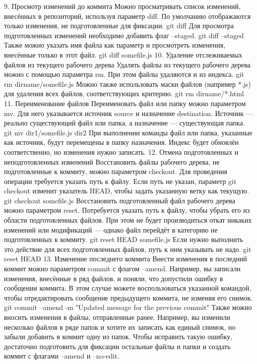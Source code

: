 {{{{{{{{{{{{{{{{{{{{9. Просмотр изменений до коммита
Можно просматривать список изменений, внесённых в репозиторий, используя параметр diff. По умолчанию отображаются только изменения, не подготовленные для фиксации.
git diff
Для просмотра подготовленных изменений необходимо добавить флаг --staged.
git diff --staged
Также можно указать имя файла как параметр и просмотреть изменения, внесённые только в этот файл.
git diff somefile.js
10. Удаление отслеживаемых файлов из текущего рабочего дерева
Удалять файлы из текущего рабочего дерева можно с помощью параметра rm. При этом файлы удаляются и из индекса.
git rm dirname/somefile.js
Можно также использовать маски файлов (например *.js) для удаления всех файлов, соответствующих критерию.
git rm dirname/*.html
11. Переименование файлов
Переименовать файл или папку можно параметром mv. Для него указывается источник source и назначение destination. Источник — реально существующий файл или папка, а назначение — существующая папка.
git mv dir1/somefile.js dir2
При выполнении команды файл или папка, указанные как источник, будут перемещены в папку назначения. Индекс будет обновлён соответственно, но изменения нужно записать.
12. Отмена подготовленных и неподготовленных изменений
Восстановить файлы рабочего дерева, не подготовленные к коммиту, можно параметром checkout. Для проведения операции требуется указать путь к файлу. Если путь не указан, параметр git checkout изменит указатель HEAD, чтобы задать указанную ветку как текущую.
git checkout somefile.js
Восстановить подготовленный файл рабочего дерева можно параметром reset. Потребуется указать путь к файлу, чтобы убрать его из области подготовленных файлов. При этом не будет производиться откат никаких изменений или модификаций — однако файл перейдёт в категорию не подготовленных к коммиту.
git reset HEAD somefile.js
Если нужно выполнить это действие для всех подготовленных файлов, путь к ним указывать не надо.
git reset HEAD
13. Изменение последнего коммита
Внести изменения в последний коммит можно параметром commit с флагом --amend. Например, вы записали изменения, внесённые в ряд файлов, и поняли, что допустили ошибку в сообщении коммита. В этом случае можете воспользоваться указанной командой, чтобы отредактировать сообщение предыдущего коммита, не изменяя его снимок.
git commit --amend -m "Updated message for the previous commit"
Также можно вносить изменения в файлы, отправленные ранее. Например, вы изменили несколько файлов в ряде папок и хотите их записать как единый снимок, но забыли добавить в коммит одну из папок. Чтобы исправить такую ошибку, достаточно подготовить для фиксации остальные файлы и папки и создать коммит с флагами --amend и --no-edit.
}}}}}}}}}}}}}}}}}}}}
